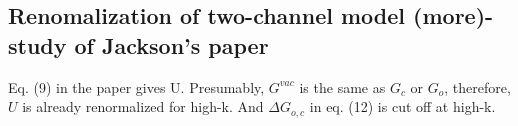 \subsection{Renomalization of two-channel model (more)-study of Jackson's paper}
Eq. (9) in the paper \cite{JacksonNarrow} gives U.  Presumably,  $G^{vac}$ is the same as $G_c$ or $G_o$, therefore, $U$ is already renormalized for high-k. And $\Delta{G_{o,c}}$ in eq. (12) is cut off at high-k. 

